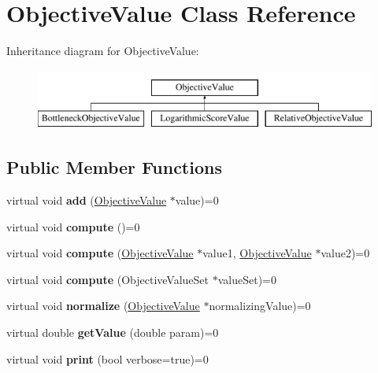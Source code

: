 \hypertarget{classObjectiveValue}{\section{Objective\-Value Class Reference}
\label{classObjectiveValue}
}
Inheritance diagram for Objective\-Value\-:\begin{figure}[H]
\begin{center}
\leavevmode
\includegraphics[height=2.000000cm]{classObjectiveValue}
\end{center}
\end{figure}
\subsection*{Public Member Functions}
\begin{DoxyCompactItemize}
\item 
\hypertarget{classObjectiveValue_a7934b001389d8b3a878958185b3e90d2}{virtual void {\bfseries add} (\hyperlink{classObjectiveValue}{Objective\-Value} $\ast$value)=0}\label{classObjectiveValue_a7934b001389d8b3a878958185b3e90d2}

\item 
\hypertarget{classObjectiveValue_ace4d2a545a72d9aa0572b56399785fb1}{virtual void {\bfseries compute} ()=0}\label{classObjectiveValue_ace4d2a545a72d9aa0572b56399785fb1}

\item 
\hypertarget{classObjectiveValue_aae11a5498d540f284ebed40584f09bd8}{virtual void {\bfseries compute} (\hyperlink{classObjectiveValue}{Objective\-Value} $\ast$value1, \hyperlink{classObjectiveValue}{Objective\-Value} $\ast$value2)=0}\label{classObjectiveValue_aae11a5498d540f284ebed40584f09bd8}

\item 
\hypertarget{classObjectiveValue_ab233604d149e5f4b8aa51ee34cba3292}{virtual void {\bfseries compute} (Objective\-Value\-Set $\ast$value\-Set)=0}\label{classObjectiveValue_ab233604d149e5f4b8aa51ee34cba3292}

\item 
\hypertarget{classObjectiveValue_afc703a4fb0d79ddd7904b339bd5e4934}{virtual void {\bfseries normalize} (\hyperlink{classObjectiveValue}{Objective\-Value} $\ast$normalizing\-Value)=0}\label{classObjectiveValue_afc703a4fb0d79ddd7904b339bd5e4934}

\item 
\hypertarget{classObjectiveValue_a66e0b4fdf1fc3bbab51ea9877aa1f7be}{virtual double {\bfseries get\-Value} (double param)=0}\label{classObjectiveValue_a66e0b4fdf1fc3bbab51ea9877aa1f7be}

\item 
\hypertarget{classObjectiveValue_a28afe825b3e9367fac69b3344bacb6a9}{virtual void {\bfseries print} (bool verbose=true)=0}\label{classObjectiveValue_a28afe825b3e9367fac69b3344bacb6a9}

\end{DoxyCompactItemize}
